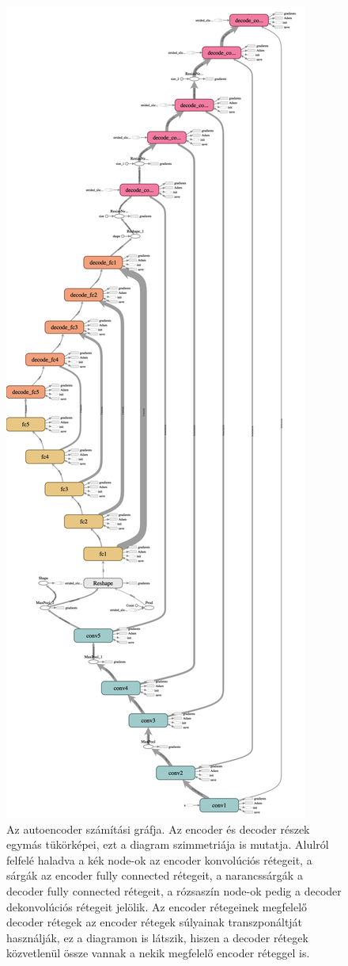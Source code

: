 \begin{figure}[p]
    \centering
    \includegraphics[height=0.70\paperheight]{src/images/tensorflow_graph_big.png}
    \caption{Az autoencoder számítási gráfja. Az encoder és decoder részek egymás tükörképei, ezt a diagram szimmetriája
    is mutatja. Alulról felfelé haladva a kék node-ok az encoder konvolúciós rétegeit, a sárgák az encoder fully connected rétegeit,
    a narancssárgák a decoder fully connected rétegeit, a rózsaszín node-ok pedig a decoder dekonvolúciós rétegeit jelölik.
    Az encoder rétegeinek megfelelő decoder rétegek az encoder rétegek súlyainak transzponáltját használják, ez a diagramon is látszik,
    hiszen a decoder rétegek közvetlenül össze vannak a nekik megfelelő encoder réteggel is.}
\end{figure}

